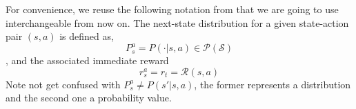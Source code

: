 
For convenience, we reuse the following notation from \cite{castro2021mico} that we are going to use interchangeable from now on. The next-state distribution for a given state-action pair $(s, a)$ is defined as,
$$P^a_s = P(\cdot|s, a) \in \mathcal{P(S)}$$, and the associated immediate reward 
$$r^a_s = r_t = \mathcal{R}(s,a)$$ 
Note not get confused with $P^a_s \neq P(s'|s, a)$, the former represents a distribution and the second one a probability value.






